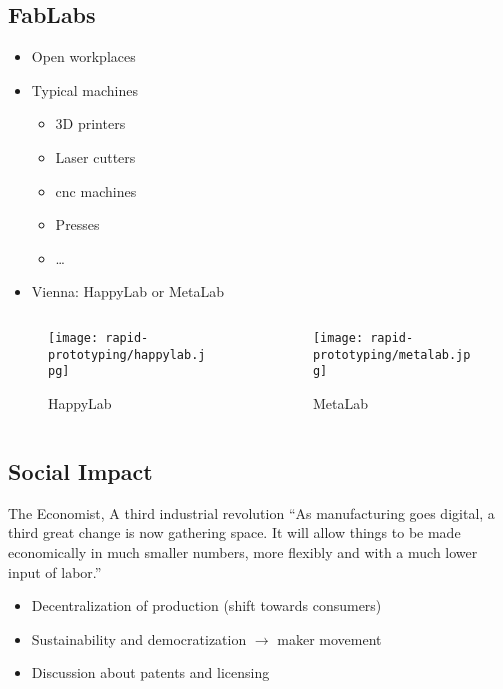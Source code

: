\documentclass[aspectratio=169]{beamer}
\begin{document}
\subsection{FabLabs}
\begin{frame}
    \begin{itemize}
        \item Open workplaces
        \item Typical machines
              \begin{itemize}
                  \item 3D printers
                  \item Laser cutters
                  \item \acs{cnc} machines
                  \item Presses
                  \item \ldots
              \end{itemize}
        \item Vienna: HappyLab or MetaLab
    \end{itemize}
    \begin{columns}
        \begin{column}{0.55\textwidth}
            \begin{figure}
                \texttt{[image: rapid-prototyping/happylab.jpg]}
                \caption{HappyLab}
            \end{figure}
        \end{column}
        \begin{column}{0.45\textwidth}
            \begin{figure}
                \texttt{[image: rapid-prototyping/metalab.jpg]}
                \caption{MetaLab}
            \end{figure}
        \end{column}
    \end{columns}
\end{frame}

\subsection{Social Impact}
\begin{frame}
    \begin{block}{The Economist, A third industrial revolution}
        ``As manufacturing goes digital, a third great change is now gathering space.
        It will allow things to be made economically in much smaller numbers, more flexibly and with a much lower input of labor.''
    \end{block}
    \begin{itemize}
        \item Decentralization of production (shift towards consumers)
        \item Sustainability and democratization $\rightarrow$ maker movement
        \item Discussion about patents and licensing
    \end{itemize}
\end{frame}
\end{document}
